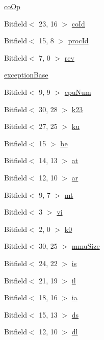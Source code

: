 \begin{DoxyCompactItemize}
\hyperlink{namespaceMipsISA_adf9c6967cc711b5d52e708d9be20ebb7}{coOp}
\item 
Bitfield$<$ 23, 16 $>$ \hyperlink{namespaceMipsISA_af4cff68366aa37c9a785427632809abc}{coId}
\item 
Bitfield$<$ 15, 8 $>$ \hyperlink{namespaceMipsISA_a49ec0df61328de7b6a5e7ad24ec2829b}{procId}
\item 
Bitfield$<$ 7, 0 $>$ \hyperlink{namespaceMipsISA_a1bfd0dd935e4ec77bd920466b8f22a79}{rev}
\item 
\hyperlink{namespaceMipsISA_af82a5b4961c19deb1c31c3e7caf815f0}{exceptionBase}
\item 
Bitfield$<$ 9, 9 $>$ \hyperlink{namespaceMipsISA_a6054ceadc76786af434927baea1897fb}{cpuNum}
\item 
Bitfield$<$ 30, 28 $>$ \hyperlink{namespaceMipsISA_a124004487a0191c054dcb962eb579b83}{k23}
\item 
Bitfield$<$ 27, 25 $>$ \hyperlink{namespaceMipsISA_a52f64f3fd2a0f5d587a1a6c46d183f96}{ku}
\item 
Bitfield$<$ 15 $>$ \hyperlink{namespaceMipsISA_a9ce4b83c9b9078006fb3ba9345c5bdcf}{be}
\item 
Bitfield$<$ 14, 13 $>$ \hyperlink{namespaceMipsISA_aae45d89ef33df5ae6cb969bb4b58f429}{at}
\item 
Bitfield$<$ 12, 10 $>$ \hyperlink{namespaceMipsISA_ad63d489b658fc87db3e2184fd0111a37}{ar}
\item 
Bitfield$<$ 9, 7 $>$ \hyperlink{namespaceMipsISA_a01dc58d27e12df489489c7355ce45ae9}{mt}
\item 
Bitfield$<$ 3 $>$ \hyperlink{namespaceMipsISA_a8e14145a8248890f18012721fd78ea2d}{vi}
\item 
Bitfield$<$ 2, 0 $>$ \hyperlink{namespaceMipsISA_a6f6750aaaac7a53cb88368e6136cb144}{k0}
\item 
Bitfield$<$ 30, 25 $>$ \hyperlink{namespaceMipsISA_a7855a07a9d8b9fd2b3754fa7ea272e69}{mmuSize}
\item 
Bitfield$<$ 24, 22 $>$ \hyperlink{namespaceMipsISA_a366f619fc9b4d8c3e351029137f7ad30}{is}
\item 
Bitfield$<$ 21, 19 $>$ \hyperlink{namespaceMipsISA_a9f671e62b8953343fc7aa99aa79c74b1}{il}
\item 
Bitfield$<$ 18, 16 $>$ \hyperlink{namespaceMipsISA_a552537e69fb6790dc747d253dcc24884}{ia}
\item 
Bitfield$<$ 15, 13 $>$ \hyperlink{namespaceMipsISA_af99c5bc05a6ca7d714ff7db9402c9cca}{ds}
\item 
Bitfield$<$ 12, 10 $>$ \hyperlink{namespaceMipsISA_a095203e359cdded376c6b9ecf71960eb}{dl}

\end{DoxyCompactItemize}
